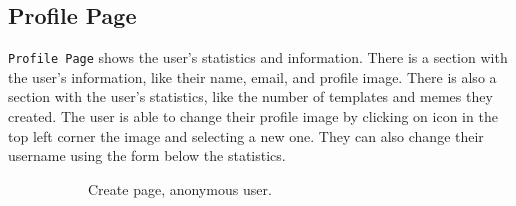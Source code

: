 \subsection{Profile Page}

\texttt{Profile Page} shows the user's statistics and information. There is a section with the user's information, like their name, email, and profile image. There is also a section with the user's statistics, like the number of templates and memes they created. The user is able to change their profile image by clicking on icon in the top left corner the image and selecting a new one. They can also change their username using the form below the statistics.

\begin{figure}
    \centering
    \begin{subfigure}{0.45\textwidth}
        \centering
        \caption{Create page, anonymous user.}
        \label{fig:wireframes-create-anonymous}
    \end{subfigure}
    \hspace{1cm}
    \begin{subfigure}{0.45\textwidth}
        \centering

\end{subfigure}
\end{figure}

